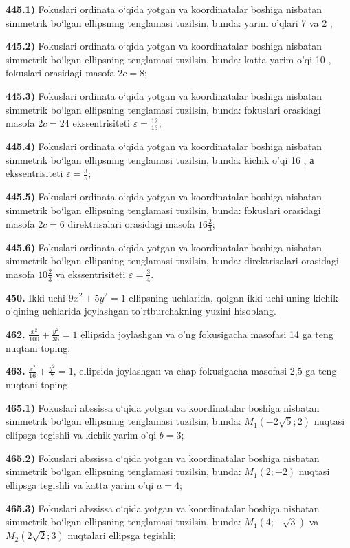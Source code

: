 \textbf{445.1)} Fokuslari ordinata o‘qida yotgan va koordinatalar boshiga nisbatan simmetrik bo‘lgan ellipsning tenglamasi tuzilsin, bunda: yarim o'qlari 7 va 2 ;

\textbf{445.2)} Fokuslari ordinata o‘qida yotgan va koordinatalar boshiga nisbatan simmetrik bo‘lgan ellipsning tenglamasi tuzilsin, bunda: katta yarim o'qi 10 , fokuslari orasidagi masofa $2 c=8$;

\textbf{445.3)} Fokuslari ordinata o‘qida yotgan va koordinatalar boshiga nisbatan simmetrik bo‘lgan ellipsning tenglamasi tuzilsin, bunda: fokuslari orasidagi masofa $2 c=24$ ekssentrisiteti $\varepsilon=\frac{12}{13}$;

\textbf{445.4)} Fokuslari ordinata o‘qida yotgan va koordinatalar boshiga nisbatan simmetrik bo‘lgan ellipsning tenglamasi tuzilsin, bunda: kichik o'qi 16 , а ekssentrisiteti $\varepsilon=\frac{3}{5}$;

\textbf{445.5)} Fokuslari ordinata o‘qida yotgan va koordinatalar boshiga nisbatan simmetrik bo‘lgan ellipsning tenglamasi tuzilsin, bunda: fokuslari orasidagi masofa $2 c=6$ direktrisalari orasidagi masofa $16 \frac{2}{3}$;

\textbf{445.6)} Fokuslari ordinata o‘qida yotgan va koordinatalar boshiga nisbatan simmetrik bo‘lgan ellipsning tenglamasi tuzilsin, bunda: direktrisalari orasidagi masofa $10 \frac{2}{3}$ va ekssentrisiteti $\varepsilon=\frac{3}{4}$.

\textbf{450.} Ikki uchi $9 x^2+5 y^2=1$ ellipsning uchlarida, qolgan ikki uchi uning kichik o'qining uchlarida joylashgan to'rtburchakning yuzini hisoblang.

\textbf{462.} $\frac{x^2}{100}+\frac{y^2}{36}=1$ ellipsida joylashgan va o'ng fokusigacha masofasi 14 ga teng nuqtani toping.

\textbf{463.} $\frac{x^2}{16}+\frac{y^2}{7}=1$, ellipsida joylashgan va chap fokusigacha masofasi 2,5 ga teng nuqtani toping.

\textbf{465.1)} Fokuslari abssissa o‘qida yotgan va koordinatalar boshiga nisbatan simmetrik bo‘lgan ellipsning tenglamasi tuzilsin, bunda: $M_1(-2 \sqrt{5} ; 2)$ nuqtasi ellipsga tegishli va kichik yarim o'qi $b=3$;

\textbf{465.2)} Fokuslari abssissa o‘qida yotgan va koordinatalar boshiga nisbatan simmetrik bo‘lgan ellipsning tenglamasi tuzilsin, bunda: $M_1(2 ;-2)$ nuqtasi ellipsga tegishli va katta yarim o'qi $a=4$;

\textbf{465.3)} Fokuslari abssissa o‘qida yotgan va koordinatalar boshiga nisbatan simmetrik bo‘lgan ellipsning tenglamasi tuzilsin, bunda: $M_1(4 ;-\sqrt{3})$ va $M_2(2 \sqrt{2} ; 3)$ nuqtalari ellipsga tegishli;

